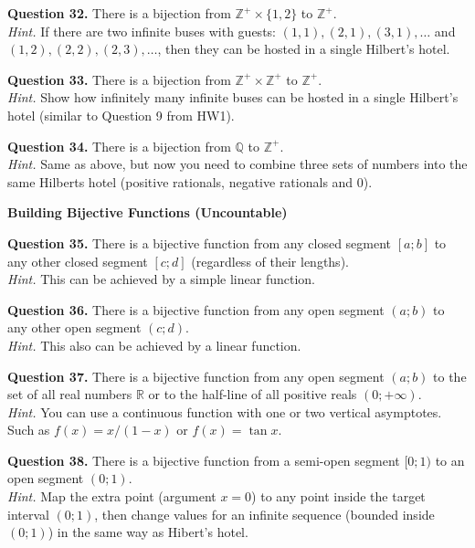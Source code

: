 \documentclass[jou]{apa6}
\begin{document}
\vspace{6pt}
{\bf Question 32.}
There is a bijection from $\mathbb{Z}^{+} \times \{ 1,2 \}$
to $\mathbb{Z}^{+}$.\\
{\em Hint.} If there are two infinite buses with guests: 
$(1,1),(2,1),(3,1),\ldots$ and $(1,2),(2,2),(2,3),\ldots$, 
then they can be hosted in a single Hilbert's hotel.

\vspace{6pt}
{\bf Question 33.}
There is a bijection from $\mathbb{Z}^{+} \times \mathbb{Z}^{+}$
to $\mathbb{Z}^{+}$.\\
{\em Hint.} Show how infinitely many infinite buses can be hosted in a 
single Hilbert's hotel (similar to Question 9 from HW1).

\vspace{6pt}
{\bf Question 34.}
There is a bijection from $\mathbb{Q}$ to $\mathbb{Z}^{+}$.\\
{\em Hint.} Same as above, but now you need to combine
three sets of numbers into the same Hilberts hotel (positive rationals, 
negative rationals and $0$). 

\vspace{20pt}
{\bf Building Bijective Functions (Uncountable)}

\vspace{6pt}
{\bf Question 35.}
There is a bijective function from any closed 
segment $[a;b]$ to any other closed segment $[c;d]$
(regardless of their lengths).\\
{\em Hint.} This can be achieved by a simple linear function.

\vspace{6pt}
{\bf Question 36.}
There is a bijective function from any open 
segment $(a;b)$ to any other open segment $(c;d)$.\\
{\em Hint.} This also can be achieved by a linear function. 

\vspace{6pt}
{\bf Question 37.}
There is a bijective function from any open 
segment $(a;b)$ to the set of all real numbers $\mathbb{R}$
or to the half-line of all positive reals $(0;+\infty)$.\\
{\em Hint.} You can use a continuous function with one or two 
vertical asymptotes. Such as $f(x) = x/(1-x)$ or $f(x) = \tan x$.

\vspace{6pt}
{\bf Question 38.}
There is a bijective function from a 
semi-open segment $[0;1)$ to an open segment $(0;1)$.\\
{\em Hint.} Map the extra point (argument $x = 0$) to any 
point inside the target interval $(0;1)$, then 
change values for an infinite sequence (bounded inside $(0;1)$)
in the same way as Hibert's hotel. 
\end{document}
